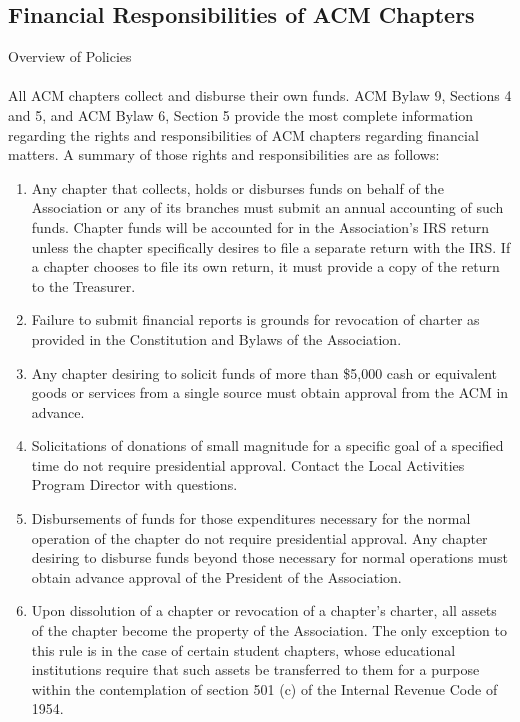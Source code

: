 \subsection{Financial Responsibilities of ACM Chapters}
Overview of Policies
\\
\\
All ACM chapters collect and disburse their own funds. ACM Bylaw 9, Sections 4 and 5, and ACM Bylaw 6, Section 5 provide the most complete information regarding the rights and responsibilities of ACM chapters regarding financial matters. A summary of those rights and responsibilities are as follows:
	\begin{enumerate}
		\item Any chapter that collects, holds or disburses funds on behalf of the Association or any of its branches must submit an annual accounting of such funds.
Chapter funds will be accounted for in the Association's IRS return unless the chapter specifically desires to file a separate return with the IRS. If a chapter chooses to file its own return, it must provide a copy of the return to the Treasurer.
		\item Failure to submit financial reports is grounds for revocation of charter as provided in the Constitution and Bylaws of the Association.
        \item Any chapter desiring to solicit funds of more than \$5,000 cash or equivalent goods or services from a single source must obtain approval from the ACM in advance.
        \item  Solicitations of donations of small magnitude for a specific goal of a specified time do not require presidential approval. Contact the Local Activities Program Director with questions.
        \item Disbursements of funds for those expenditures necessary for the normal operation of the chapter do not require presidential approval. Any chapter desiring to disburse funds beyond those necessary for normal operations must obtain advance approval of the President of the Association.
        \item Upon dissolution of a chapter or revocation of a chapter's charter, all assets of the chapter become the property of the Association. The only exception to this rule is in the case of certain student chapters, whose educational institutions require that such assets be transferred to them for a purpose within the contemplation of section 501 (c) of the Internal Revenue Code of 1954.
	\end{enumerate}

